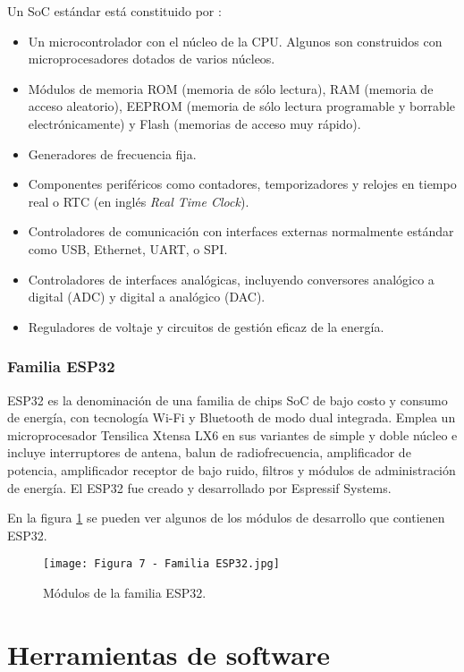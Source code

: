 Un SoC estándar está constituido por \citep{12}:

\begin{itemize}
	\item Un microcontrolador con el núcleo de la CPU. Algunos son construidos con microprocesadores dotados de varios núcleos.
	\item Módulos de memoria ROM (memoria de sólo lectura), RAM (memoria de acceso aleatorio), EEPROM (memoria de sólo lectura programable y borrable electrónicamente) y Flash (memorias de acceso muy rápido).
	\item Generadores de frecuencia fija.
	\item Componentes periféricos como contadores, temporizadores y relojes en tiempo real o RTC (en inglés \textit{Real Time Clock}).
	\item Controladores de comunicación con interfaces externas normalmente estándar como USB, Ethernet, UART, o SPI.
	\item Controladores de interfaces analógicas, incluyendo conversores analógico a digital (ADC) y digital a analógico (DAC).
	\item Reguladores de voltaje y circuitos de gestión eficaz de la energía.
\end{itemize}

\subsubsection{Familia ESP32}

ESP32 es la denominación de una familia de chips SoC de bajo costo y consumo de energía, con tecnología Wi-Fi y Bluetooth de modo dual integrada. Emplea un microprocesador Tensilica Xtensa LX6 en sus variantes de simple y doble núcleo e incluye interruptores de antena, balun de radiofrecuencia, amplificador de potencia, amplificador receptor de bajo ruido, filtros y módulos de administración de energía. El ESP32 fue creado y desarrollado por Espressif Systems.

En la figura \ref{fig:8} se pueden ver algunos de los módulos de desarrollo que contienen ESP32.

\begin{figure}[h]
\centering
\texttt{[image: Figura 7 - Familia ESP32.jpg]}
\caption[Familia ESP32]{Módulos de la familia ESP32. \footnotemark}
\label{fig:8}
\end{figure}

\section{Herramientas de software}
